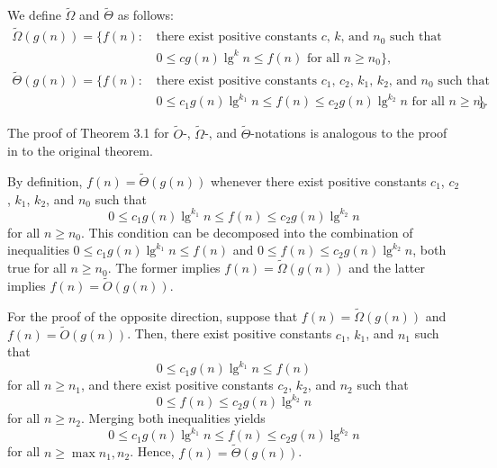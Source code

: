 We define $\widetilde{\Omega}$ and $\widetilde{\Theta}$ as follows:
\begin{align*}
    \widetilde{\Omega}(g(n)) = \{f(n):\,{} & \text{there exist positive constants $c$, $k$, and $n_0$ such that} \\
    & \text{$0 \le cg(n)\lg^kn \le f(n)$ for all $n \ge n_0$}\}, \\[2mm]
    \widetilde{\Theta}(g(n)) = \{f(n):\,{} & \text{there exist positive constants $c_1$, $c_2$, $k_1$, $k_2$, and $n_0$ such that} \\
    & \text{$0 \le c_1g(n)\lg^{k_1}n \le f(n) \le c_2g(n)\lg^{k_2}n$ for all $n \ge n_0$}\}.
\end{align*}

The proof of Theorem 3.1 for $\widetilde{O}$-, $\widetilde{\Omega}$-, and $\widetilde{\Theta}$-notations is analogous to the proof in  to the original theorem.

By definition, $f(n)=\widetilde{\Theta}(g(n))$ whenever there exist positive constants $c_1$, $c_2$, $k_1$, $k_2$, and $n_0$ such that
\[
    0 \le c_1g(n)\lg^{k_1}n \le f(n) \le c_2g(n)\lg^{k_2}n
\]
for all $n\ge n_0$.
This condition can be decomposed into the combination of inequalities $0\le c_1g(n)\lg^{k_1}n\le f(n)$ and $0\le f(n)\le c_2g(n)\lg^{k_2}n$, both true for all $n\ge n_0$.
The former implies $f(n)=\widetilde{\Omega}(g(n))$ and the latter implies $f(n)=\widetilde{O}(g(n))$.

For the proof of the opposite direction, suppose that $f(n)=\widetilde{\Omega}(g(n))$ and $f(n)=\widetilde{O}(g(n))$.
Then, there exist positive constants $c_1$, $k_1$, and $n_1$ such that
\[
    0 \le c_1g(n)\lg^{k_1}n \le f(n)
\]
for all $n\ge n_1$, and there exist positive constants $c_2$, $k_2$, and $n_2$ such that
\[
    0 \le f(n) \le c_2g(n)\lg^{k_2}n
\]
for all $n\ge n_2$.
Merging both inequalities yields
\[
    0 \le c_1g(n)\lg^{k_1}n \le f(n) \le c_2g(n)\lg^{k_2}n
\]
for all $n\ge\max{n_1,n_2}$.
Hence, $f(n)=\widetilde{\Theta}(g(n))$.
